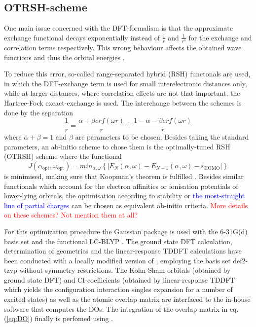\subsection{OTRSH-scheme}
One main issue concerned with the DFT-formalism is that the approximate exchange functional decays exponentially instead of $\frac 1r$ and $\frac{1}{r^4}$ for the exchange and correlation terms respectively.
This wrong behaviour affects the obtained wave functions and thus the orbital energies \cite{Bokareva}.

To reduce this error, so-called range-separated hybrid (RSH) functonals are used, in which the DFT-exchange term is used for small interelectronic distances only, while at larger distances, where correlation effects are not that important, the Hartree-Fock excact-exchange is used.
The interchange between the schemes is done by the separation
\begin{equation}
   \frac 1r = \frac{\alpha +\beta erf(\omega r)}{r} +\frac{1-\alpha-\beta erf(\omega r)}{r}
\end{equation}
where $\alpha+\beta=1$ and $\beta$ are parameters to be chosen.
Besides taking the standard parameters, an ab-initio scheme to chose them is the optimally-tuned RSH (OTRSH) scheme where the functional
\begin{equation}\label{eq:J_ao}
   J(\alpha_\text{opt},\omega_\text{opt})=min_{\alpha, \omega} \left\{ |E_N(\alpha,\omega)-E_{N-1}(\alpha,\omega)-\varepsilon_\text{HOMO}| \right\}
\end{equation}
is minimised, making sure that Koopman's theorem is fulfilled \cite{Bokareva}.
Besides similar functionals which account for the electron affinities or ionisation potentials of lower-lying orbitals, the optimisation according to stability or \textcolor{blue}{the most-straight line of partial charges} can be chosen as equivalent ab-initio criteria.
\textcolor{red}{More details on these schemes? Not mention them at all?}

For this optimization procedure the Gaussian package  \cite{g09} is used with the 6-31G(d) \cite{6-31g,6-31gd} basis set and the functional LC-BLYP \cite{lcblyp}. 
The ground state DFT calculation, determination of geometries and the linear-response TDDFT calculations have been conducted with a locally modified version of  \cite{nwchem}, employing the basis set def2-tzvp \cite{def2tzvp} without symmetry restrictions.
The Kohn-Sham orbitals (obtained by ground state DFT) and CI-coefficients (obtained by linear-response TDDFT which yields the configuration interaction singles expansion for a number of excited states) as well as the atomic overlap matrix are interfaced to the in-house software  \cite{MAgg} that computes the DOs.
The integration of the overlap matrix in eq. (\ref{eq:DO}) finally is perfomed using  \cite{ezDyson}.

